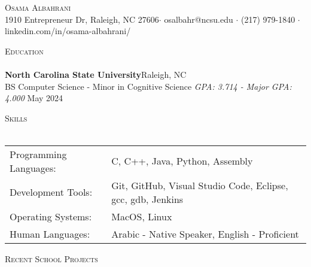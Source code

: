 \documentclass[a4paper]{article}
\newcommand{\lineunder} {
    \vspace*{-8pt} \\
    \hspace*{-18pt} \hrulefill \\
}
\newcommand{\header} [1] {
    {\hspace*{-18pt}\vspace*{6pt} \textsc{#1}}
    \vspace*{-6pt} \lineunder
}
\begin{document}
\vspace*{-40pt}

    

\vspace*{-10pt}
\begin{center}
	{\Huge \scshape {Osama Albahrani}}\\
	1910 Entrepreneur Dr, Raleigh, NC 27606$\cdot$ osalbahr@ncsu.edu $\cdot$ (217) 979-1840 $\cdot$ linkedin.com/in/osama-albahrani/\\
\end{center}

\header{Education}
\textbf{North Carolina State University}\hfill Raleigh, NC\\
BS Computer Science - Minor in Cognitive Science \textit{GPA: 3.714 - Major GPA: 4.000} \hfill May 2024\\
\vspace{2mm}

\header{Skills}
\begin{tabular}{ l l }
	Programming Languages:                      & C, C++, Java, Python, Assembly                                  \\
	Development Tools:                      & Git, GitHub, Visual Studio Code, Eclipse, gcc, gdb, Jenkins                                   \\
	Operating Systems: & MacOS, Linux                   \\
	Human Languages:                                  & Arabic - Native Speaker, English - Proficient \\
\end{tabular}
\vspace{2mm}

\header{Recent School Projects}
\vspace{1mm}
\end{document}
